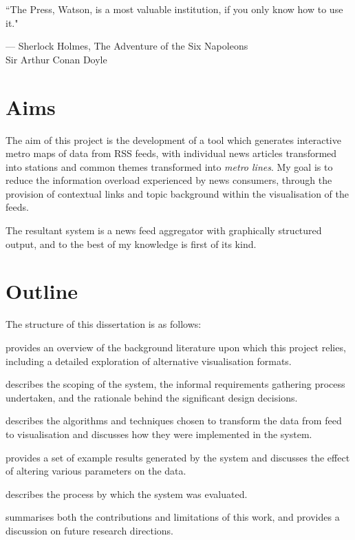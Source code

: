 \epigraph{``The Press, Watson, is a most valuable institution, if you only know how to use it."}{--- \textup{Sherlock Holmes}, The Adventure of the Six Napoleons\\[0.2cm] \textup{Sir Arthur Conan Doyle}}

\section*{Aims}
The aim of this project is the development of a tool which generates interactive metro maps of data from RSS feeds, with individual news articles transformed into stations and common themes transformed into \textit{metro lines}. My goal is to reduce the information overload experienced by news consumers, through the provision of contextual links and topic background within the visualisation of the feeds.

The resultant system is a news feed aggregator with graphically structured output, and to the best of my knowledge is first of its kind.

\section*{Outline}

The structure of this dissertation is as follows:
\begin{description}[leftmargin=5.6em,style=nextline]
	\item [Chapter \ref{c:litreview}] provides an overview of the background literature upon which this project relies, including a detailed exploration of alternative visualisation formats.
	\item [Chapter \ref{c:reqs}] describes the scoping of the system, the informal requirements gathering process undertaken, and the rationale behind the significant design decisions.
	\item [Chapter \ref{c:implementation}] describes the algorithms and techniques chosen to transform the data from feed to visualisation and discusses how they were implemented in the system.
	\item [Chapter \ref{c:results}] provides a set of example results generated by the system and discusses the effect of altering various parameters on the data.
	\item [Chapter \ref{c:evaluation}] describes the process by which the system was evaluated.
	\item [Chapter \ref{c:conclusions}] summarises both the contributions and limitations of this work, and provides a discussion on future research directions.
\end{description}

